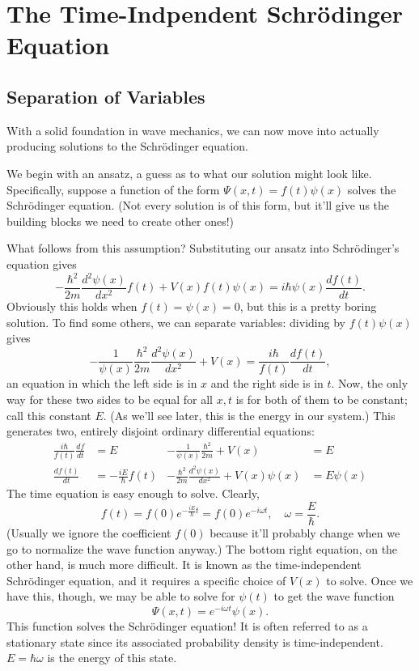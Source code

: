 \documentclass[../p052main.tex]{subfiles}
\begin{document}
\chapter{The Time-Indpendent Schrödinger Equation}
\section{Separation of Variables}
With a solid foundation in wave mechanics, we can now move into actually producing solutions to the Schrödinger equation.

We begin with an ansatz, a guess as to what our solution might look like.
Specifically, suppose a function of the form $\Psi(x,t) = f(t) \psi(x)$ solves the Schrödinger equation.
(Not every solution is of this form, but it'll give us the building blocks we need to create other ones!)

What follows from this assumption?
Substituting our ansatz into Schrödinger's equation gives
\[ -\frac{\hbar^2}{2m} \frac{d^2 \psi(x)}{dx^2} f(t) + V(x)f(t)\psi(x) = i\hbar \psi(x) \frac{df(t)}{dt}. \]
Obviously this holds when $f(t) = \psi(x) = 0$, but this is a pretty boring solution.
To find some others, we can separate variables: dividing by $f(t)\psi(x)$ gives
\[ -\frac{1}{\psi(x)}\frac{\hbar^2}{2m} \frac{d^2 \psi(x)}{dx^2} + V(x) = \frac{i\hbar}{f(t)} \frac{df(t)}{dt}, \]
an equation in which the left side is in $x$ and the right side is in $t$.
Now, the only way for these two sides to be equal for all $x,t$ is for both of them to be constant; call this constant $E$.
(As we'll see later, this is the energy in our system.)
This generates two, entirely disjoint ordinary differential equations:
\begin{align*}
    \frac{i\hbar}{f(t)}\frac{df}{dt} &= E & -\frac{1}{\psi(x)}\frac{\hbar^2}{2m} + V(x) &= E \\
    \frac{df(t)}{dt} &= -\frac{iE}{\hbar} f(t) & -\frac{\hbar^2}{2m} \frac{d^2 \psi(x)}{dx^2} + V(x) \psi(x) &= E \psi (x)
\end{align*}
The time equation is easy enough to solve.
Clearly,
\[ f(t) = f(0) e^{-\frac{iE}{\hbar}t} = f(0) e^{-i \omega t}, \quad \omega = \frac{E}{\hbar}. \]
(Usually we ignore the coefficient $f(0)$ because it'll probably change when we go to normalize the wave function anyway.)
The bottom right equation, on the other hand, is much more difficult.
It is known as the time-independent Schrödinger equation, and it requires a specific choice of $V(x)$ to solve.
Once we have this, though, we may be able to solve for $\psi(t)$ to get the wave function
\[ \Psi(x,t) = e^{-i \omega t} \psi(x). \]
This function solves the Schrödinger equation!
It is often referred to as a stationary state since its associated probability density is time-independent.
$E = \hbar \omega$ is the energy of this state.
\end{document}
